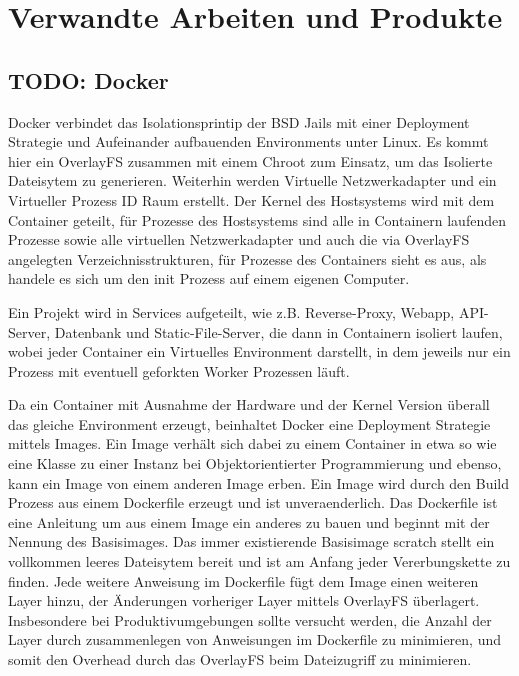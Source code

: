 \section{Verwandte Arbeiten und Produkte}
\label{sec:related-work}

\subsection{TODO: Docker}
Docker verbindet das Isolationsprintip der BSD Jails mit einer Deployment
Strategie und Aufeinander aufbauenden Environments unter Linux.
Es kommt hier ein OverlayFS zusammen mit einem Chroot zum Einsatz, um das
Isolierte Dateisytem zu generieren. Weiterhin werden Virtuelle Netzwerkadapter
und ein Virtueller Prozess ID Raum erstellt. Der Kernel des Hostsystems wird mit
dem Container geteilt, f\"{u}r Prozesse des Hostsystems sind alle in Containern
laufenden Prozesse sowie alle virtuellen Netzwerkadapter und auch die via
OverlayFS angelegten Verzeichnisstrukturen, f\"{u}r Prozesse des Containers
sieht es aus, als handele es sich um den init Prozess auf einem eigenen
Computer.

Ein Projekt wird in Services aufgeteilt, wie z.B. Reverse-Proxy, Webapp,
API-Server, Datenbank und Static-File-Server, die dann in Containern isoliert
laufen, wobei jeder Container ein Virtuelles Environment darstellt, in dem 
jeweils nur ein Prozess mit eventuell geforkten Worker Prozessen l\"{a}uft.

Da ein Container mit Ausnahme der Hardware und der Kernel Version \"{u}berall
das gleiche Environment erzeugt, beinhaltet Docker eine Deployment Strategie
mittels Images. Ein Image verh\"{a}lt sich dabei zu einem Container in etwa so
wie eine Klasse zu einer Instanz bei Objektorientierter Programmierung und
ebenso, kann ein Image von einem anderen Image erben. Ein Image wird durch den
Build Prozess aus einem Dockerfile erzeugt und ist unveraenderlich. Das
Dockerfile ist eine Anleitung um aus einem Image ein anderes zu bauen und
beginnt mit der Nennung des Basisimages. Das immer existierende Basisimage
scratch stellt ein vollkommen leeres Dateisytem bereit und ist am Anfang jeder
Vererbungskette zu finden. Jede weitere Anweisung im Dockerfile f\"{u}gt dem
Image einen weiteren Layer hinzu, der \"{A}nderungen vorheriger Layer mittels
OverlayFS \"{u}berlagert. Insbesondere bei Produktivumgebungen sollte versucht
werden, die Anzahl der Layer durch zusammenlegen von Anweisungen im Dockerfile
zu minimieren, und somit den Overhead durch das OverlayFS beim Dateizugriff zu
minimieren.

